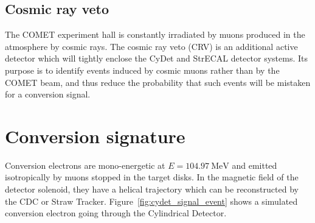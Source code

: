 \subsection{Cosmic ray veto}
The COMET experiment hall is constantly irradiated by muons produced in the
atmosphere by cosmic rays. The cosmic ray veto (CRV) is an additional active
detector which will tightly enclose the CyDet and StrECAL detector systems. Its
purpose is to identify events induced by cosmic muons rather than by the COMET
beam, and thus reduce the probability that such events will be mistaken for a
conversion signal.

\section{Conversion signature}
Conversion electrons are mono-energetic at $E=\SI{104.97}{\MeV}$ and emitted
isotropically by muons stopped in the target disks. In the magnetic field of the
detector solenoid, they have a helical trajectory which can be reconstructed by
the CDC or Straw Tracker. Figure~\ref{fig:cydet_signal_event} shows a simulated
conversion electron going through the Cylindrical Detector.



